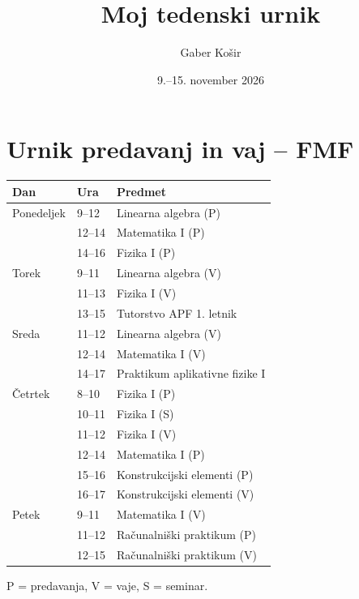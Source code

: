 \documentclass[a4paper,11pt]{article}
\title{Moj tedenski urnik}
\author{Gaber Košir}
\date{9.--15. november 2026}
\begin{document}
\maketitle

\section*{Urnik predavanj in vaj -- FMF}

\small
\renewcommand{\arraystretch}{1.5}

\begin{tabularx}{\textwidth}{|l|l|X|}
\hline
\textbf{Dan} & \textbf{Ura} & \textbf{Predmet} \\
\hline
Ponedeljek & 9--12 & Linearna algebra (P) \\
& 12--14 & Matematika I (P) \\
& 14--16 & Fizika I (P) \\
\hline
Torek & 9--11 & Linearna algebra (V) \\
& 11--13 & Fizika I (V) \\
& 13--15 & Tutorstvo APF 1. letnik \\
\hline
Sreda & 11--12 & Linearna algebra (V) \\
& 12--14 & Matematika I (V) \\
& 14--17 & Praktikum aplikativne fizike I \\
\hline
Četrtek & 8--10 & Fizika I (P) \\
& 10--11 & Fizika I (S) \\
& 11--12 & Fizika I (V) \\
& 12--14 & Matematika I (P) \\
& 15--16 & Konstrukcijski elementi (P) \\
& 16--17 & Konstrukcijski elementi (V) \\
\hline
Petek & 9--11 & Matematika I (V) \\
& 11--12 & Računalniški praktikum (P) \\
& 12--15 & Računalniški praktikum (V) \\
\hline
\end{tabularx}

\vspace{1cm}

\noindent
P = predavanja, V = vaje, S = seminar.
\end{document}

